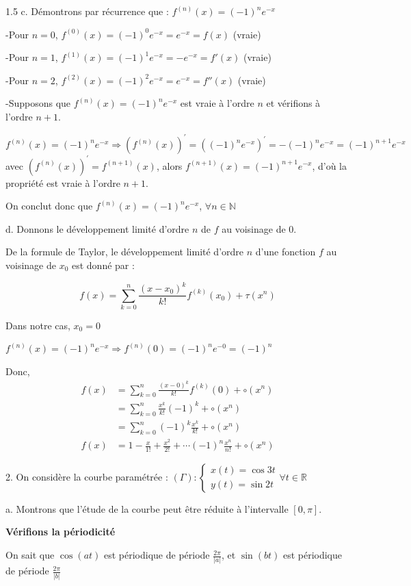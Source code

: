 \documentclass[12pt]{article}
\begin{document}
\begin{spacing}{1.5}
c. Démontrons par récurrence que : $f^{(n)}(x)=(-1)^ne^{-x}$

-Pour $n=0$, $f^{(0)}(x)=(-1)^0e^{-x}=e^{-x}=f(x)$ (vraie)

-Pour $n=1$, $f^{(1)}(x)=(-1)^1e^{-x}=-e^{-x}=f'(x)$ (vraie)

-Pour $n=2$, $f^{(2)}(x)=(-1)^2e^{-x}=e^{-x}=f''(x)$ (vraie)

-Supposons que $f^{(n)}(x)=(-1)^ne^{-x}$ est vraie à l'ordre $n$ et vérifions à l'ordre $n+1$.

$f^{(n)}(x)=(-1)^ne^{-x}\Rightarrow (f^{(n)}(x))^\prime=((-1)^ne^{-x})^\prime=-(-1)^ne^{-x}=(-1)^{n+1}e^{-x}$ avec $(f^{(n)}(x))^\prime=f^{(n+1)}(x)$, alors $f^{(n+1)}(x)=(-1)^{n+1}e^{-x}$, d'où la propriété est vraie à l'ordre $n+1$.

On conclut donc que $f^{(n)}(x)=(-1)^ne^{-x}$, $\forall n\in \mathbb{N}$

d. Donnons le développement limité d'ordre $n$ de $f$ au voisinage de $0$.

De la formule de Taylor, le développement limité d'ordre $n$ d'une fonction $f$ au voisinage de $x_0$ est donné par :

\[
f(x)=\sum_{k=0}^{n}\frac{(x-x_0)^k}{k!}f^{(k)}(x_0)+\tau(x^n)
\]

Dans notre cas, $x_0=0$

$f^{(n)}(x)=(-1)^ne^{-x}\Rightarrow f^{(n)}(0)=(-1)^ne^{-0}=(-1)^n$

Donc,
\begin{align*}
f(x)&=\sum_{k=0}^{n}\frac{(x-0)^k}{k!}f^{(k)}(0)+\circ(x^n)\\
&=\sum_{k=0}^{n}\frac{x^k}{k!}(-1)^k+\circ(x^n)\\
&=\sum_{k=0}^{n}(-1)^k\frac{x^k}{k!}+\circ(x^n)\\
f(x)&=1-\frac{x}{1!}+\frac{x^2}{2!}+\cdots (-1)^n\frac{x^n}{n!}+\circ(x^n)
\end{align*}

2. On considère la courbe paramétrée : $(\Gamma) :\begin{cases}
x(t)=\cos 3t\\
y(t)=\sin 2t
\end{cases} \forall t\in \mathbb{R}$

a. Montrons que l'étude de la courbe peut être réduite à l'intervalle $[0,\pi]$.

\textbf{Vérifions la périodicité}

On sait que $\cos(at)$ est périodique de période $\frac{2\pi}{\vert a\vert}$, et $\sin(bt)$ est périodique de période $\frac{2\pi}{\vert b\vert}$


\end{spacing}
\end{document}
